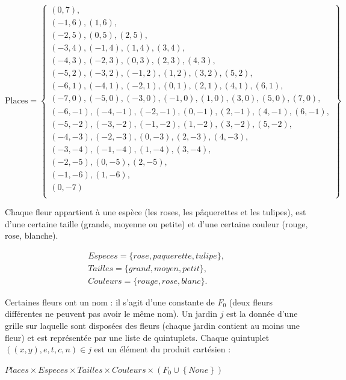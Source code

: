 \[
\mathrm{Places}  = \left \{
\begin{array}{c}
(0,7) ,
\\
(-1,6), (1,6) ,
\\
(-2,5) , (0,5) , (2,5),
\\
(-3,4) , (-1,4) , (1,4) , (3,4),
\\
(-4,3), (-2,3), (0,3) , (2,3), (4,3),
\\
(-5,2),(-3,2) , (-1,2) , (1,2) , (3,2), (5,2),
\\
(-6,1),(-4,1), (-2,1), (0,1) , (2,1) , (4,1),(6,1),
\\
(-7,0) , (-5,0) , (-3,0) , (-1,0) , (1,0) , (3,0) , (5,0) , (7,0) ,
\\
(-6,-1),(-4,-1), (-2,-1), (0,-1) , (2,-1), (4,-1),(6,-1),
\\
(-5,-2),(-3,-2), (-1,-2), (1,-2) , (3,-2),(5,-2),
\\
(-4,-3), (-2,-3) , (0,-3) , (2,-3), (4,-3),
\\
(-3,-4), (-1,-4), (1,-4) , (3,-4) ,
\\
(-2,-5) , (0,-5) , (2,-5),
\\
(-1,-6),  (1,-6),
\\
(0,-7)
\\
\end{array}
\right \}
\]

Chaque fleur appartient à une espèce (les roses, les pâquerettes et
les tulipes), est d'une certaine taille (grande, moyenne ou petite) et
d'une certaine couleur (rouge, rose, blanche).

 \[ \begin{array}{l}
   Especes =  \{rose, paquerette,tulipe \}, \\
   Tailles =  \{grand, moyen, petit \},\\
   Couleurs = \{rouge,rose, blanc \}.
\end{array}
\]

Certaines fleurs ont un nom : il s'agit d'une constante de $F_0$ (deux
fleurs différentes ne peuvent pas avoir le même nom). Un jardin $j$
est la donnée d'une grille sur laquelle sont disposées des fleurs
(chaque jardin contient au moins une fleur) et est représentée par une
liste de quintuplets. Chaque quintuplet $((x, y), e, t, c, n) \in j$
est un élément du produit cartésien :

 \begin{center}
 $Places \times Especes \times Tailles \times Couleurs \times(F_0 \cup \left \{None\right \})$ 
 \end{center}
 

